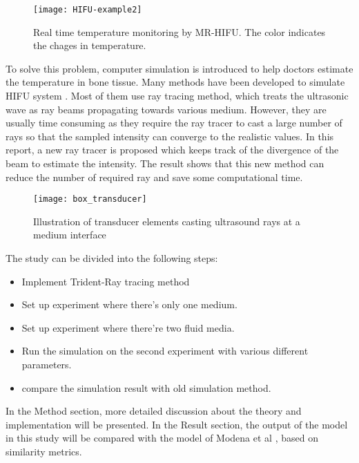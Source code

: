 \begin{figure}[h]
    \centering
    \texttt{[image: HIFU-example2]}
    \caption{Real time temperature monitoring by MR-HIFU. The color indicates the chages in temperature. \cite{vanwijk2013}}
    \label{fig:HIFU_example}
\end{figure}

To solve this problem, computer simulation is introduced to help doctors estimate the temperature in bone tissue. Many methods have been developed to simulate HIFU system \cite{StochasticSim}. Most of them use ray tracing method, which treats the ultrasonic wave as ray beams propagating towards various medium. However, they are usually time consuming as they require the ray tracer to cast a large number of rays so that the sampled intensity can converge to the realistic values. In this report, a new ray tracer is proposed which keeps track of the divergence of the beam to estimate the intensity. The result shows that this new method can reduce the number of required ray and save some computational time.

\begin{figure}[h]
    \centering
    \texttt{[image: box\_transducer]}
    \caption{Illustration of transducer elements casting ultrasound rays at a medium interface}
    \label{fig:transducer_coordinates}
\end{figure}

The study can be divided into the following steps:

\begin{itemize}
    \item Implement Trident-Ray tracing method
    \item Set up experiment where there's only one medium.
    \item Set up experiment where there're two fluid media.
    \item Run the simulation on the second experiment with various different parameters.
    \item compare the simulation result with old simulation method.
\end{itemize}

In the Method section, more detailed discussion about the theory and implementation will be presented. In the Result section, the output of the model in this study will be compared with the model of Modena et al \cite{Modena_2018}, based on similarity metrics.
